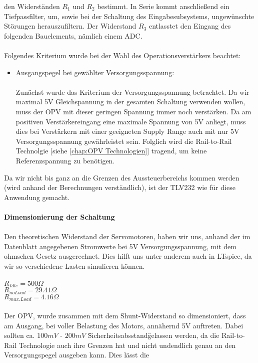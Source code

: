 \documentclass[titlepage,12pt,twoside]{article}
\begin{document}
den Widerständen $R_{1}$ und $R_{2}$ bestimmt. In Serie kommt anschließend ein Tiefpassfilter, um, sowie bei der Schaltung des Eingabesubsystems,
ungewünschte Störungen herauszufiltern. Der Widerstand $R_{3}$ entlasstet den Eingang des folgenden Bauelements, nämlich einem ADC. \\
\\
Folgendes Kriterium wurde bei der Wahl des Operationsverstärkers beachtet:
\begin{itemize}
	\item Ausgangspegel bei gewählter Versorgungsspannung: \\
		  \\
		  Zunächst wurde das Kriterium der Versorgungsspannung betrachtet. Da wir maximal
		  5V Gleichspannung in der gesamten Schaltung verwenden wollen, muss der OPV mit
		  dieser geringen Spannung immer noch verstärken. Da am positiven Verstärkereingang
		  eine maximale Spannung von 5V anliegt, muss dies bei Verstärkern mit einer geeigneten
		  Supply Range auch mit nur 5V Versorgungsspannung gewährleistet sein. Folglich wird
		  die Rail-to-Rail Technolgie [siehe \textcolor{blue}{\autoref{chap:OPV Technologien}}] tragend, um keine Referenzspannung
		  zu benötigen.
\end{itemize}
Da wir nicht bis ganz an die Grenzen des Aussteuerbereichs kommen werden (wird anhand der Berechnungen verständlich), ist der TLV232 wie für diese Anwendung gemacht. \\
\\
\textbf{Dimensionierung der Schaltung} \\
\\
Den theoretischen Widerstand der Servomotoren, haben wir uns, anhand der im Datenblatt angegebenen Stromwerte bei 5V Versorgungsspannung, mit dem ohmschen Gesetz ausgerechnet.
Dies hilft uns unter anderem auch in LTspice, da wir so verschiedene Lasten simulieren können. \\
\\
$R_{Idle} = 500\Omega$ \\
$R_{no Load} = 29.41\Omega$ \\
$R_{max. Load} = 4.16\Omega$ \\
\\
Der OPV, wurde zusammen mit dem Shunt-Widerstand so dimensioniert, dass am Ausgang, bei voller Belastung des Motors, annähernd 5V auftreten. Dabei sollten ca. $100mV$ - $200mV$ 
\"Sicherheitsabsstand\" gelassen werden, da die Rail-to-Rail Technologie auch ihre Grenzen hat und nicht undendlich genau an den Versorgungspegel ausgeben kann. Dies lässt die 
\end{document}
